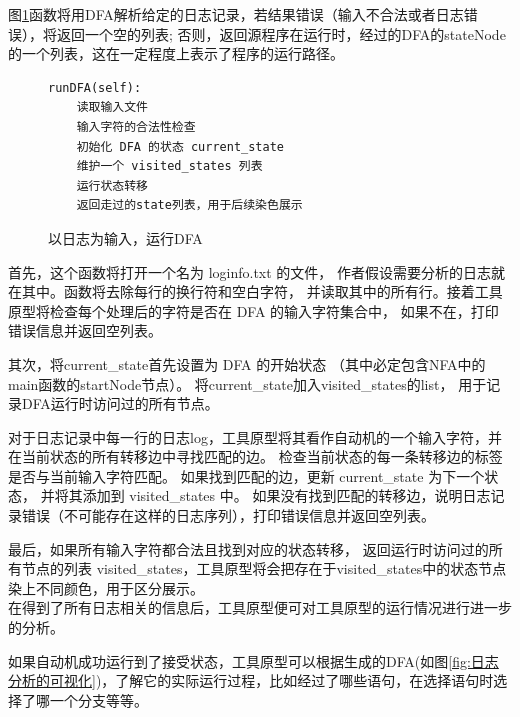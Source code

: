 图\ref{以日志为输入，运行DFA}函数将用DFA解析给定的日志记录，若结果错误（输入不合法或者日志错误），将返回一个空的列表;
否则，返回源程序在运行时，经过的DFA的stateNode的一个列表，这在一定程度上表示了程序的运行路径。\\
 \begin{figure}[htbp]
	\centering
\begin{minipage}{8cm}
\begin{lstlisting}
runDFA(self):
    读取输入文件
    输入字符的合法性检查
    初始化 DFA 的状态 current_state
    维护一个 visited_states 列表
    运行状态转移
    返回走过的state列表，用于后续染色展示
\end{lstlisting}
\end{minipage}
    \caption{以日志为输入，运行DFA}
    \label{以日志为输入，运行DFA}
\end{figure}

首先，这个函数将打开一个名为 loginfo.txt 的文件，
作者假设需要分析的日志就在其中。函数将去除每行的换行符和空白字符，
并读取其中的所有行。接着工具原型将检查每个处理后的字符是否在 DFA 的输入字符集合中，
如果不在，打印错误信息并返回空列表。

其次，将current\_state首先设置为 DFA 的开始状态
（其中必定包含NFA中的main函数的startNode节点）。
将current\_state加入visited\_states的list，
用于记录DFA运行时访问过的所有节点。

对于日志记录中每一行的日志log，工具原型将其看作自动机的一个输入字符，并在当前状态的所有转移边中寻找匹配的边。
检查当前状态的每一条转移边的标签是否与当前输入字符匹配。
如果找到匹配的边，更新 current\_state 为下一个状态，
并将其添加到 visited\_states 中。
如果没有找到匹配的转移边，说明日志记录错误（不可能存在这样的日志序列），打印错误信息并返回空列表。

最后，如果所有输入字符都合法且找到对应的状态转移，
返回运行时访问过的所有节点的列表 visited\_states，工具原型将会把存在于visited\_states中的状态节点染上不同颜色，用于区分展示。\\

在得到了所有日志相关的信息后，工具原型便可对工具原型的运行情况进行进一步的分析。

如果自动机成功运行到了接受状态，工具原型可以根据生成的DFA(如图\ref{fig:日志分析的可视化})，了解它的实际运行过程，比如经过了哪些语句，在选择语句时选择了哪一个分支等等。

